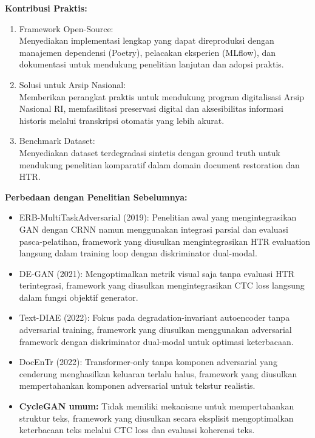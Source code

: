 \documentclass[12pt,a4paper]{article}
\begin{document}
\newpage
\textbf{Kontribusi Praktis:}
\begin{enumerate}[label=\arabic*., leftmargin=1cm]
    \item Framework Open-Source: \\
    Menyediakan implementasi lengkap yang dapat direproduksi dengan manajemen dependensi (Poetry), pelacakan eksperien (MLflow), dan dokumentasi untuk mendukung penelitian lanjutan dan adopsi praktis.

    \item Solusi untuk Arsip Nasional: \\
    Memberikan perangkat praktis untuk mendukung program digitalisasi Arsip Nasional RI, memfasilitasi preservasi digital dan aksesibilitas informasi historis melalui transkripsi otomatis yang lebih akurat.

    \item Benchmark Dataset: \\
    Menyediakan dataset terdegradasi sintetis dengan ground truth untuk mendukung penelitian komparatif dalam domain document restoration dan HTR.
\end{enumerate}

\vspace{0.5em}
\textbf{Perbedaan dengan Penelitian Sebelumnya:}
\begin{itemize}[leftmargin=1cm, noitemsep]
    \item ERB-MultiTaskAdversarial (2019): Penelitian awal yang mengintegrasikan GAN dengan CRNN namun menggunakan integrasi parsial dan evaluasi pasca-pelatihan, framework yang diusulkan mengintegrasikan HTR evaluation langsung dalam training loop dengan diskriminator dual-modal.

    \item DE-GAN (2021): Mengoptimalkan metrik visual saja tanpa evaluasi HTR terintegrasi, framework yang diusulkan mengintegrasikan CTC loss langsung dalam fungsi objektif generator.

    \item Text-DIAE (2022): Fokus pada degradation-invariant autoencoder tanpa adversarial training, framework yang diusulkan menggunakan adversarial framework dengan diskriminator dual-modal untuk optimasi keterbacaan.

    \item DocEnTr (2022): Transformer-only tanpa komponen adversarial yang cenderung menghasilkan keluaran terlalu halus, framework yang diusulkan mempertahankan komponen adversarial untuk tekstur realistis.

    \item \textbf{CycleGAN umum:} Tidak memiliki mekanisme untuk mempertahankan struktur teks, framework yang diusulkan secara eksplisit mengoptimalkan keterbacaan teks melalui CTC loss dan evaluasi koherensi teks.
\end{itemize}
\newpage
\end{document}
